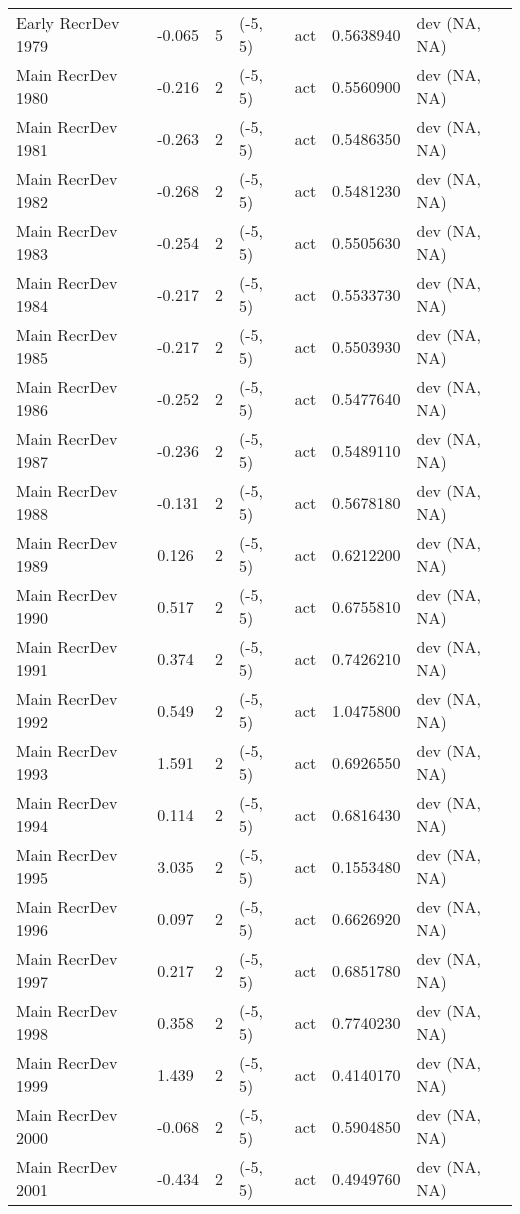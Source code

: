 \documentclass[11pt,
  english,
  a4paper,
]{article}
\begin{document}
\begin{landscape}
\begin{longtable}[t]{>{\raggedright\arraybackslash}p{6cm}lllll>{\raggedright\arraybackslash}p{4cm}}
Early RecrDev 1979 & -0.065 & 5 & (-5, 5) & act & 0.5638940 & dev (NA, NA)\\
Main RecrDev 1980 & -0.216 & 2 & (-5, 5) & act & 0.5560900 & dev (NA, NA)\\
Main RecrDev 1981 & -0.263 & 2 & (-5, 5) & act & 0.5486350 & dev (NA, NA)\\
Main RecrDev 1982 & -0.268 & 2 & (-5, 5) & act & 0.5481230 & dev (NA, NA)\\
Main RecrDev 1983 & -0.254 & 2 & (-5, 5) & act & 0.5505630 & dev (NA, NA)\\
Main RecrDev 1984 & -0.217 & 2 & (-5, 5) & act & 0.5533730 & dev (NA, NA)\\
Main RecrDev 1985 & -0.217 & 2 & (-5, 5) & act & 0.5503930 & dev (NA, NA)\\
Main RecrDev 1986 & -0.252 & 2 & (-5, 5) & act & 0.5477640 & dev (NA, NA)\\
Main RecrDev 1987 & -0.236 & 2 & (-5, 5) & act & 0.5489110 & dev (NA, NA)\\
Main RecrDev 1988 & -0.131 & 2 & (-5, 5) & act & 0.5678180 & dev (NA, NA)\\
Main RecrDev 1989 & 0.126 & 2 & (-5, 5) & act & 0.6212200 & dev (NA, NA)\\
Main RecrDev 1990 & 0.517 & 2 & (-5, 5) & act & 0.6755810 & dev (NA, NA)\\
Main RecrDev 1991 & 0.374 & 2 & (-5, 5) & act & 0.7426210 & dev (NA, NA)\\
Main RecrDev 1992 & 0.549 & 2 & (-5, 5) & act & 1.0475800 & dev (NA, NA)\\
Main RecrDev 1993 & 1.591 & 2 & (-5, 5) & act & 0.6926550 & dev (NA, NA)\\
Main RecrDev 1994 & 0.114 & 2 & (-5, 5) & act & 0.6816430 & dev (NA, NA)\\
Main RecrDev 1995 & 3.035 & 2 & (-5, 5) & act & 0.1553480 & dev (NA, NA)\\
Main RecrDev 1996 & 0.097 & 2 & (-5, 5) & act & 0.6626920 & dev (NA, NA)\\
Main RecrDev 1997 & 0.217 & 2 & (-5, 5) & act & 0.6851780 & dev (NA, NA)\\
Main RecrDev 1998 & 0.358 & 2 & (-5, 5) & act & 0.7740230 & dev (NA, NA)\\
Main RecrDev 1999 & 1.439 & 2 & (-5, 5) & act & 0.4140170 & dev (NA, NA)\\
Main RecrDev 2000 & -0.068 & 2 & (-5, 5) & act & 0.5904850 & dev (NA, NA)\\
Main RecrDev 2001 & -0.434 & 2 & (-5, 5) & act & 0.4949760 & dev (NA, NA)\\

\end{longtable}
\end{landscape}
\end{document}
